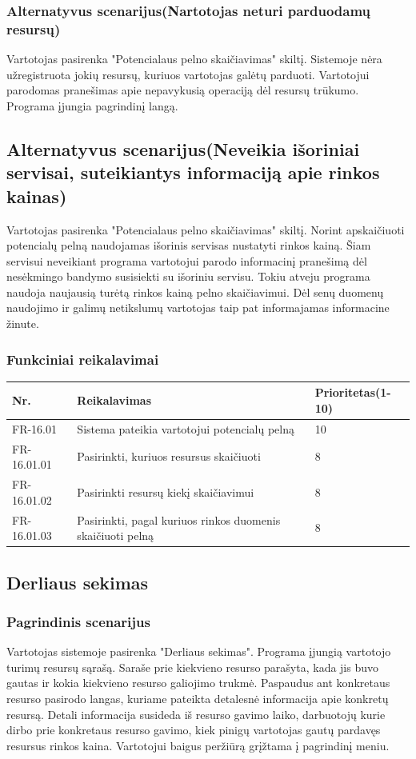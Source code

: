 \documentclass[oneside]{VUMIFPSkursinis}
\begin{document}
	\subsubsection{Alternatyvus scenarijus(Nartotojas neturi parduodamų resursų)}
	Vartotojas pasirenka "Potencialaus pelno skaičiavimas" skiltį. Sistemoje nėra užregistruota jokių resursų, kuriuos vartotojas galėtų parduoti. Vartotojui parodomas pranešimas apie nepavykusią operaciją dėl resursų trūkumo. Programa įjungia pagrindinį langą. 
	\subsection{Alternatyvus scenarijus(Neveikia išoriniai servisai, suteikiantys informaciją apie rinkos kainas)}
	Vartotojas pasirenka "Potencialaus pelno skaičiavimas" skiltį. Norint apskaičiuoti potencialų pelną naudojamas išorinis servisas nustatyti rinkos kainą. Šiam servisui neveikiant programa vartotojui parodo informacinį pranešimą dėl nesėkmingo bandymo susisiekti su išoriniu servisu. Tokiu atveju programa naudoja naujausią turėtą rinkos kainą pelno skaičiavimui. Dėl senų duomenų naudojimo ir galimų netikslumų vartotojas taip pat informajamas informacine žinute.
	\subsubsection{Funkciniai reikalavimai}
\begin{table}[htbp]
	\begin{tabularx}{1\textwidth}{ |P{2.5cm}|X|P{3cm }| }  \hline
		Nr. & Reikalavimas & Prioritetas(1-10) \\ \hline
		FR-16.01 & Sistema pateikia vartotojui potencialų pelną & 10 \\ \hline
		FR-16.01.01 & Pasirinkti, kuriuos resursus skaičiuoti & 8 \\ \hline
		FR-16.01.02 & Pasirinkti resursų kiekį skaičiavimui & 8 \\ \hline
		FR-16.01.03 & Pasirinkti, pagal kuriuos rinkos duomenis skaičiuoti pelną & 8 \\ \hline
	\end{tabularx}
\end{table}	
\subsection{Derliaus sekimas}
	\subsubsection{Pagrindinis scenarijus}
	Vartotojas sistemoje pasirenka "Derliaus sekimas". Programa įjungią vartotojo turimų resursų sąrašą. Saraše prie kiekvieno resurso parašyta, kada jis buvo gautas ir kokia kiekvieno resurso galiojimo trukmė. Paspaudus ant konkretaus resurso pasirodo langas, kuriame pateikta detalesnė informacija apie konkretų resursą. Detali informacija susideda iš resurso gavimo laiko, darbuotojų kurie dirbo prie konkretaus resurso gavimo, kiek pinigų vartotojas gautų pardavęs resursus rinkos kaina. Vartotojui baigus peržiūrą grįžtama į pagrindinį meniu.
\end{document}

